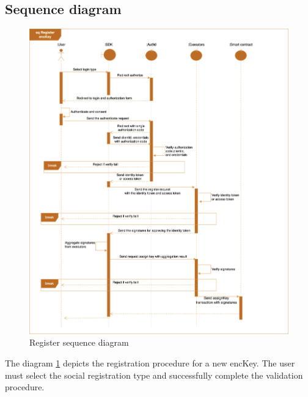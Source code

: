 \documentclass[../Main.tex]{subfiles}
\begin{document}
\subsection{Sequence diagram}
\begin{figure}[H]
 \centering
 \includegraphics[scale=0.14]{Figure/register-sequence-diagram.png}
 \caption{Register sequence diagram}
    \label{fig:register-sequence-diagram}
\end{figure}
The diagram \ref{fig:register-sequence-diagram} depicts the registration procedure for a new encKey.  The user must select the social registration type and successfully complete the validation procedure.
\end{document}
